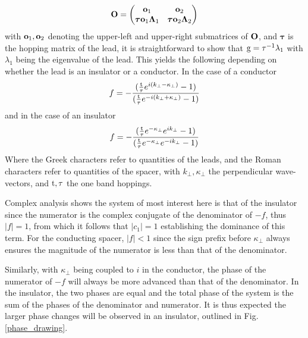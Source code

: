 \documentclass[a4paper, 12pt]{article}
\begin{document}
\begin{equation}
	{\bf O} = \begin{pmatrix} {\bf o}_1&{\bf o}_2\\{\bf \bm \tau o}_1\bm\Lambda_1&{\bf \bm \tau o}_2\bm\Lambda_2 \end{pmatrix}
\end{equation}
with ${\bf o}_1, {\bf o}_2$ denoting the upper-left and upper-right submatrices of $\bf O$, and $\bm \tau$ is the hopping matrix of the lead,
it is straightforward to show that 
$\rm g =\tau^{-1}\lambda_1$ with $\lambda_1$ being the eigenvalue of the lead.
This yields the following depending on whether the lead is an insulator or a conductor. In the case of a conductor
\begin{equation}\label{conductor}
	f = -\frac{(\frac{\rm t}{\tau}e^{i(k_\perp - \kappa_\perp)}-1)}{(\frac{\rm t}{\tau}e^{-i(k_\perp +\kappa_\perp)}-1)}
\end{equation}
and in the case of an insulator
\begin{equation}\label{insulator}
	f = -\frac{(\frac{\rm t}{\tau}e^{-\kappa_\perp} e^{ ik_\perp}-1)}{(\frac{\rm t}{\tau}e^{-\kappa_\perp} e^{-ik_\perp}-1)}
\end{equation}
Where the Greek characters refer to quantities of the leads, and the Roman characters refer to quantities of the spacer, with $k_\perp, \kappa_\perp$ the perpendicular wave-vectors, and ${\rm t}, \tau$ the one band hoppings.
\\\par Complex analysis shows the system of most interest here is that of the insulator since the numerator is the complex conjugate of the denominator of $-f$, thus $|f|=1$, from which it follows that $|c_1| = 1$ establishing the dominance of this term. For the conducting spacer, $|f|<1$ since the sign prefix before $\kappa_\perp$ always ensures the magnitude of the numerator is less than that of the denominator.
\\\par Similarly, with $\kappa_\perp$ being coupled to $i$ in the conductor, the phase of the numerator of $-f$ will always be more advanced than that of the denominator. In the insulator, the two phases are equal and the total phase of the system is the sum of the phases of the denominator and numerator. It is thus expected the larger phase changes will be observed in an insulator, outlined in Fig. \ref{phase_drawing}.
\end{document}
